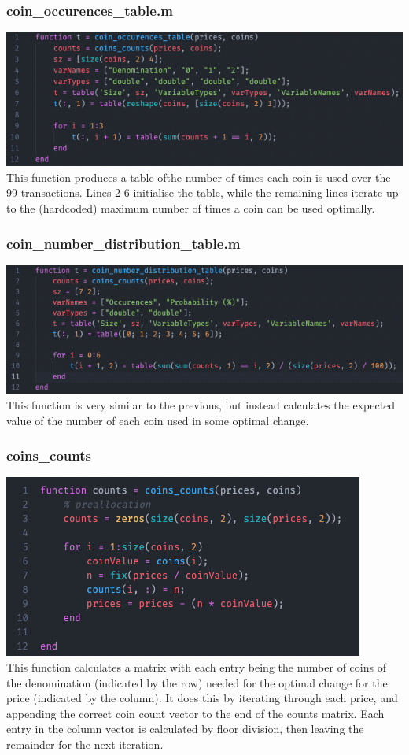 \documentclass{article}
\begin{document}
\subsubsection{coin\_occurences\_table.m}
\includegraphics[width=\textwidth]{task_1/coin_occurences_table.m..png}
\\
This function produces a table ofthe number of times each coin is used over the 99 transactions.
Lines 2-6 initialise the table, while the remaining lines iterate up to the (hardcoded) maximum number of times a coin can be used optimally.


\subsubsection{coin\_number\_distribution\_table.m}
\includegraphics[width=\textwidth]{task_1/coin_number_distribution_table.m.png}
This function is very similar to the previous, but instead calculates the expected value of the number of each coin used in some optimal change.

\subsubsection{coins\_counts}
\includegraphics[width=\textwidth]{task_1/coins_counts.m.png}
\\
This function calculates a matrix with each entry being the number of coins of the denomination (indicated by the row) needed for the optimal change for the price (indicated by the column).
It does this by iterating through each price, and appending the correct coin count vector to the end of the counts matrix.
Each entry in the column vector is calculated by floor division, then leaving the remainder for the next iteration.
\newpage
\end{document}
